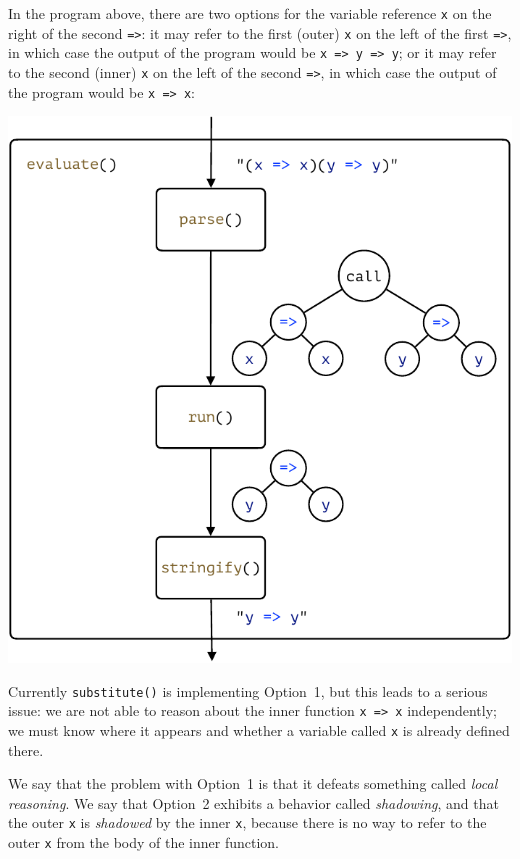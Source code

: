 \documentclass[12pt, oneside]{book}
\begin{document}
In the program above, there are two options for the variable reference \texttt{x} on the right of the second \texttt{=>}: it may refer to the first (outer) \texttt{x} on the left of the first \texttt{=>}, in which case the output of the program would be \texttt{x => y => y}; or it may refer to the second (inner) \texttt{x} on the left of the second \texttt{=>}, in which case the output of the program would be \texttt{x => x}:

\begin{center}
\includegraphics[page = 7]{images.pdf}
\end{center}

Currently \texttt{substitute()} is implementing Option~1, but this leads to a serious issue: we are not able to reason about the inner function \texttt{x => x} independently; we must know where it appears and whether a variable called \texttt{x} is already defined there.

\begin{mdframed}[frametitle = {Technical Terms}]
We say that the problem with Option~1 is that it defeats something called \emph{local reasoning}. We say that Option~2 exhibits a behavior called \emph{shadowing}, and that the outer \texttt{x} is \emph{shadowed} by the inner \texttt{x}, because there is no way to refer to the outer \texttt{x} from the body of the inner function.
\end{mdframed}
\end{document}
